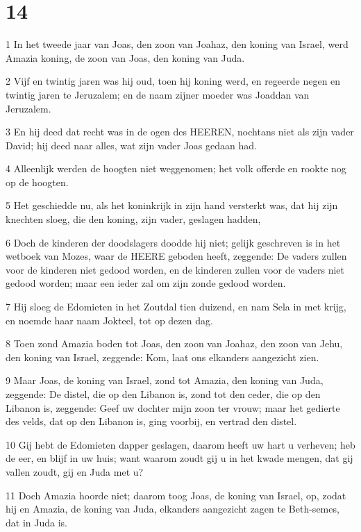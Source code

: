 \chapter{14}

\par 1 In het tweede jaar van Joas, den zoon van Joahaz, den koning van Israel, werd Amazia koning, de zoon van Joas, den koning van Juda.
\par 2 Vijf en twintig jaren was hij oud, toen hij koning werd, en regeerde negen en twintig jaren te Jeruzalem; en de naam zijner moeder was Joaddan van Jeruzalem.
\par 3 En hij deed dat recht was in de ogen des HEEREN, nochtans niet als zijn vader David; hij deed naar alles, wat zijn vader Joas gedaan had.
\par 4 Alleenlijk werden de hoogten niet weggenomen; het volk offerde en rookte nog op de hoogten.
\par 5 Het geschiedde nu, als het koninkrijk in zijn hand versterkt was, dat hij zijn knechten sloeg, die den koning, zijn vader, geslagen hadden,
\par 6 Doch de kinderen der doodslagers doodde hij niet; gelijk geschreven is in het wetboek van Mozes, waar de HEERE geboden heeft, zeggende: De vaders zullen voor de kinderen niet gedood worden, en de kinderen zullen voor de vaders niet gedood worden; maar een ieder zal om zijn zonde gedood worden.
\par 7 Hij sloeg de Edomieten in het Zoutdal tien duizend, en nam Sela in met krijg, en noemde haar naam Jokteel, tot op dezen dag.
\par 8 Toen zond Amazia boden tot Joas, den zoon van Joahaz, den zoon van Jehu, den koning van Israel, zeggende: Kom, laat ons elkanders aangezicht zien.
\par 9 Maar Joas, de koning van Israel, zond tot Amazia, den koning van Juda, zeggende: De distel, die op den Libanon is, zond tot den ceder, die op den Libanon is, zeggende: Geef uw dochter mijn zoon ter vrouw; maar het gedierte des velds, dat op den Libanon is, ging voorbij, en vertrad den distel.
\par 10 Gij hebt de Edomieten dapper geslagen, daarom heeft uw hart u verheven; heb de eer, en blijf in uw huis; want waarom zoudt gij u in het kwade mengen, dat gij vallen zoudt, gij en Juda met u?
\par 11 Doch Amazia hoorde niet; daarom toog Joas, de koning van Israel, op, zodat hij en Amazia, de koning van Juda, elkanders aangezicht zagen te Beth-semes, dat in Juda is.
